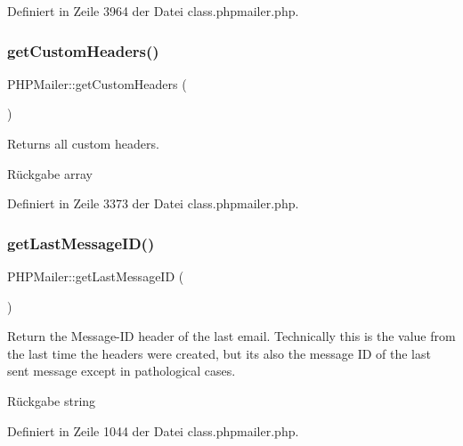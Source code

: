 Definiert in Zeile 3964 der Datei class.\+phpmailer.\+php.

\mbox{\label{class_p_h_p_mailer_aa685d75b52b7ced5ddb1c3bfcc482b99}} 
\subsubsection{\texorpdfstring{get\+Custom\+Headers()}{getCustomHeaders()}}
{\footnotesize\ttfamily P\+H\+P\+Mailer\+::get\+Custom\+Headers (\begin{DoxyParamCaption}{ }\end{DoxyParamCaption})}

Returns all custom headers. \begin{DoxyReturn}{Rückgabe}
array 
\end{DoxyReturn}


Definiert in Zeile 3373 der Datei class.\+phpmailer.\+php.

\mbox{\label{class_p_h_p_mailer_abe341255f193c97147b97b274dbe5231}} 
\subsubsection{\texorpdfstring{get\+Last\+Message\+I\+D()}{getLastMessageID()}}
{\footnotesize\ttfamily P\+H\+P\+Mailer\+::get\+Last\+Message\+ID (\begin{DoxyParamCaption}{ }\end{DoxyParamCaption})}

Return the Message-\/\+ID header of the last email. Technically this is the value from the last time the headers were created, but it\textquotesingle{}s also the message ID of the last sent message except in pathological cases. \begin{DoxyReturn}{Rückgabe}
string 
\end{DoxyReturn}


Definiert in Zeile 1044 der Datei class.\+phpmailer.\+php.

\mbox{\label{class_p_h_p_mailer_a4238784c168132810accd750323bc150}} 
